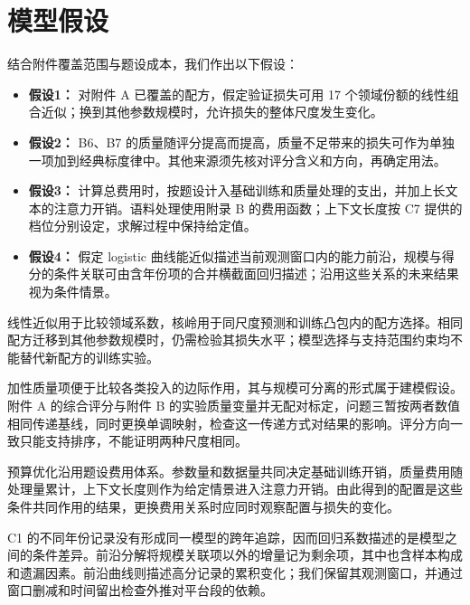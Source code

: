 \section{模型假设}

结合附件覆盖范围与题设成本，我们作出以下假设：

\begin{itemize}[itemindent=2em]
\item \textbf{假设1：} 对附件 A 已覆盖的配方，假定验证损失可用 17 个领域份额的线性组合近似；换到其他参数规模时，允许损失的整体尺度发生变化。
\item \textbf{假设2：} B6、B7 的质量随评分提高而提高，质量不足带来的损失可作为单独一项加到经典标度律中。其他来源须先核对评分含义和方向，再确定用法。
\item \textbf{假设3：} 计算总费用时，按题设计入基础训练和质量处理的支出，并加上长文本的注意力开销。语料处理使用附录 B 的费用函数；上下文长度按 C7 提供的档位分别设定，求解过程中保持给定值。
\item \textbf{假设4：} 假定 logistic 曲线能近似描述当前观测窗口内的能力前沿，规模与得分的条件关联可由含年份项的合并横截面回归描述；沿用这些关系的未来结果视为条件情景。
\end{itemize}

线性近似用于比较领域系数，核岭用于同尺度预测和训练凸包内的配方选择。相同配方迁移到其他参数规模时，仍需检验其损失水平；模型选择与支持范围约束均不能替代新配方的训练实验。

加性质量项便于比较各类投入的边际作用，其与规模可分离的形式属于建模假设。附件 A 的综合评分与附件 B 的实验质量变量并无配对标定，问题三暂按两者数值相同传递基线，同时更换单调映射，检查这一传递方式对结果的影响。评分方向一致只能支持排序，不能证明两种尺度相同。

预算优化沿用题设费用体系。参数量和数据量共同决定基础训练开销，质量费用随处理量累计，上下文长度则作为给定情景进入注意力开销。由此得到的配置是这些条件共同作用的结果，更换费用关系时应同时观察配置与损失的变化。

C1 的不同年份记录没有形成同一模型的跨年追踪，因而回归系数描述的是模型之间的条件差异。前沿分解将规模关联项以外的增量记为剩余项，其中也含样本构成和遗漏因素。前沿曲线则描述高分记录的累积变化；我们保留其观测窗口，并通过窗口删减和时间留出检查外推对平台段的依赖。
